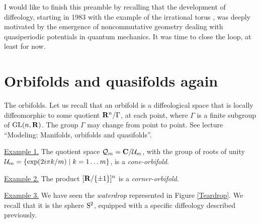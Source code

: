 I would like to finish this preamble by recalling that the development of diffeology,
starting in 1983 with the example of the irrational torus \cite{DI83},
was deeply motivated by the emergence of noncommutative geometry dealing with quasiperiodic potentials in quantum mechanics.
It was time to close the loop,
at least for now.

\section{Orbifolds and quasifolds again}


\begin{Article}{The orbifolds.}{}
  Let us recall that an orbifold is a diffeological space that is locally diffeomorphic to some quotient $\mathbf{R}^n/\Gamma$,
  at each point,
  where $\Gamma$ is a finite subgroup of $\mathrm{GL}(n,\mathbf{R})$.
  The group $\Gamma$ may change from point to point.
  See lecture ``Modeling: Manifolds, orbifolds and quasifolds''.
  
  \uline{Example 1.} The quotient space $\mathcal{Q}_m = \mathbf{C}/\mathcal{U}_m$,
  with the group of roots of unity $\mathcal{U}_m = \{ \exp(2i\pi k/m) \mid k = 1 \dots m\}$,
  is a \emph{cone-orbifold}.
  
  \uline{Example 2.} The product $[\mathbf{R}/\{\pm 1\}]^n$ is a \emph{corner-orbifold}.
  
  \uline{Example 3.} We have seen the \emph{waterdrop} represented in Figure \ref{Teardrop}.
  We recall that it is the sphere $\mathrm{S}^2$,
  equipped with a specific diffeology described previously.
\end{Article}

